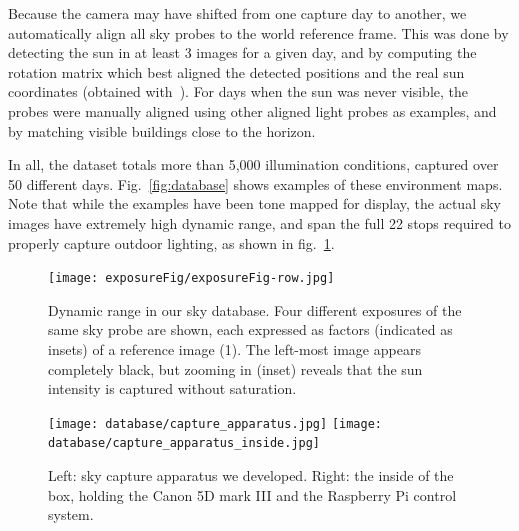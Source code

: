 Because the camera may have shifted from one capture day to another, we automatically align all sky probes to the world reference frame. This was done by detecting the sun in at least 3 images for a given day, and by computing the rotation matrix which best aligned the detected positions and the real sun coordinates (obtained with~\cite{reda-se-04}). For days when the sun was never visible, the probes were manually aligned using other aligned light probes as examples, and by matching visible buildings close to the horizon.

In all, the dataset totals more than 5,000 illumination conditions, captured over 50 different days. Fig.~\ref{fig:database} shows examples of these environment maps. Note that while the examples have been tone mapped for display, the actual sky images have extremely high dynamic range, and span the full 22 stops required to properly capture outdoor lighting, as shown in fig.~\ref{fig:exposure}.

\begin{figure}
\centering
\texttt{[image: exposureFig/exposureFig-row.jpg]}
\caption[Sky Database]{Dynamic range in our sky database. Four different exposures of the same sky probe are shown, each expressed as factors (indicated as insets) of a reference image (1). The left-most image appears completely black, but zooming in (inset) reveals that the sun intensity is captured without saturation.}
\label{fig:exposure}
\end{figure}


\begin{figure}
\centering
\texttt{[image: database/capture\_apparatus.jpg]}
\texttt{[image: database/capture\_apparatus\_inside.jpg]}
\caption[Database capture apparatus]{Left: sky capture apparatus we developed. Right: the inside of the box, holding the Canon 5D mark III and the Raspberry Pi control system.}
\label{fig:capture-apparatus}
\end{figure}


